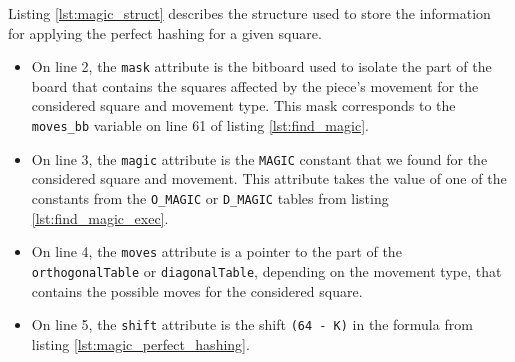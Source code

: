 \documentclass[12pt,a4paper,twoside,openright]{book}
\begin{document}
Listing \ref{lst:magic_struct} describes the structure used to store the information for applying the perfect hashing for a given square.
\begin{itemize}
\item On line 2, the \texttt{mask} attribute is the bitboard used to isolate the part of the board that contains the squares affected by the piece's movement for the considered square and movement type. This mask corresponds to the \texttt{moves_bb} variable on line 61 of listing \ref{lst:find_magic}.

\item On line 3, the \texttt{magic} attribute is the \texttt{MAGIC} constant that we found for the considered square and movement. This attribute takes the value of one of the constants from the \texttt{O_MAGIC} or \texttt{D_MAGIC} tables from listing \ref{lst:find_magic_exec}.

\item On line 4, the \texttt{moves} attribute is a pointer to the part of the \texttt{orthogonalTable} or \texttt{diagonalTable}, depending on the movement type, that contains the possible moves for the considered square.

\item On line 5, the \texttt{shift} attribute is the shift \texttt{(64 - K)} in the formula from listing \ref{lst:magic_perfect_hashing}.


\end{itemize}
\end{document}
